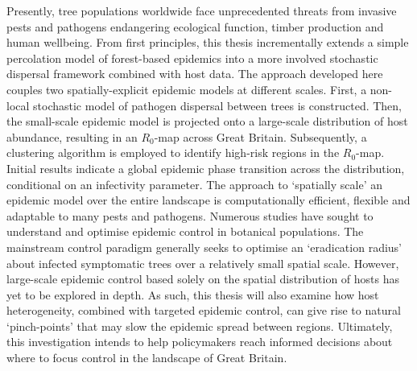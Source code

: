 Presently, tree populations worldwide face unprecedented threats from invasive pests and pathogens endangering ecological function, timber production and human wellbeing. 
From first principles, this thesis incrementally extends a simple percolation model of forest-based epidemics into a more involved stochastic dispersal framework combined with host data. 
The approach developed here couples two spatially-explicit epidemic models at different scales. 
First, a non-local stochastic model of pathogen dispersal between trees is constructed. 
Then, the small-scale epidemic model is projected onto a large-scale distribution of host abundance, resulting in an $R_0$-map across Great Britain. 
Subsequently, a clustering algorithm is employed to identify high-risk regions in the $R_0$-map. 
Initial results indicate a global epidemic phase transition across the distribution, conditional on an infectivity parameter.
The approach to `spatially scale' an epidemic model over the entire landscape is computationally efficient, flexible and adaptable to many pests and pathogens. 
Numerous studies have sought to understand and optimise epidemic control in botanical populations. 
The mainstream control paradigm generally seeks to optimise an `eradication radius' about infected symptomatic trees over a relatively small spatial scale. However, large-scale epidemic control based solely on the spatial distribution of hosts has yet to be explored in depth. 
As such, this thesis will also examine how host heterogeneity, combined with targeted epidemic control, can give rise to natural `pinch-points' that may slow the epidemic spread between regions. 
Ultimately, this investigation intends to help policymakers reach informed decisions about where to focus control in the landscape of Great Britain.


\newcommand{\RNum}[1]{\uppercase\expandafter{\romannumeral #1\relax}}
